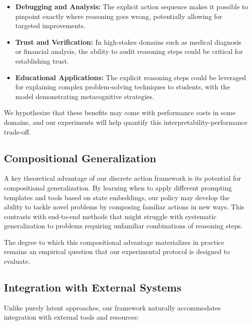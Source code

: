 \documentclass[10pt,journal,compsoc]{IEEEtran}
\begin{document}
\begin{itemize}
\item \textbf{Debugging and Analysis:} The explicit action sequence makes it possible to pinpoint exactly where reasoning goes wrong, potentially allowing for targeted improvements.

\item \textbf{Trust and Verification:} In high-stakes domains such as medical diagnosis or financial analysis, the ability to audit reasoning steps could be critical for establishing trust.

\item \textbf{Educational Applications:} The explicit reasoning steps could be leveraged for explaining complex problem-solving techniques to students, with the model demonstrating metacognitive strategies.
\end{itemize}

We hypothesize that these benefits may come with performance costs in some domains, and our experiments will help quantify this interpretability-performance trade-off.

\subsection{Compositional Generalization}

A key theoretical advantage of our discrete action framework is its potential for compositional generalization. By learning when to apply different prompting templates and tools based on state embeddings, our policy may develop the ability to tackle novel problems by composing familiar actions in new ways. This contrasts with end-to-end methods that might struggle with systematic generalization to problems requiring unfamiliar combinations of reasoning steps.

The degree to which this compositional advantage materializes in practice remains an empirical question that our experimental protocol is designed to evaluate.

\subsection{Integration with External Systems}

Unlike purely latent approaches, our framework naturally accommodates integration with external tools and resources:
\end{document}
